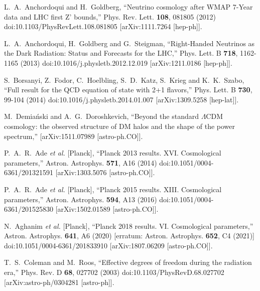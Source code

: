 \documentclass[universe,article,submit,moreauthors,pdftex,a4paper]{Definitions/mdpi}
\begin{document}
\begin{thebibliography}{99}
L.~A.~Anchordoqui and H.~Goldberg,
``Neutrino cosmology after WMAP 7-Year data and LHC first Z' bounds,''
Phys. Rev. Lett. \textbf{108}, 081805 (2012)
doi:10.1103/PhysRevLett.108.081805
[arXiv:1111.7264 [hep-ph]].

L.~A.~Anchordoqui, H.~Goldberg and G.~Steigman,
``Right-Handed Neutrinos as the Dark Radiation: Status and Forecasts for the LHC,''
Phys. Lett. B \textbf{718}, 1162-1165 (2013)
doi:10.1016/j.physletb.2012.12.019
[arXiv:1211.0186 [hep-ph]].

S.~Borsanyi, Z.~Fodor, C.~Hoelbling, S.~D.~Katz, S.~Krieg and K.~K.~Szabo,
``Full result for the QCD equation of state with 2+1 flavors,''
Phys. Lett. B \textbf{730}, 99-104 (2014)
doi:10.1016/j.physletb.2014.01.007
[arXiv:1309.5258 [hep-lat]].

M.~Demia\'nski and A.~G.~Doroshkevich,
``Beyond the standard $\Lambda$CDM cosmology: the observed structure of DM halos and the shape of the power spectrum,''
[arXiv:1511.07989 [astro-ph.CO]].

P.~A.~R.~Ade \textit{et al.} [Planck],
``Planck 2013 results. XVI. Cosmological parameters,''
Astron. Astrophys. \textbf{571}, A16 (2014)
doi:10.1051/0004-6361/201321591
[arXiv:1303.5076 [astro-ph.CO]].

P.~A.~R.~Ade \textit{et al.} [Planck],
``Planck 2015 results. XIII. Cosmological parameters,''
Astron. Astrophys. \textbf{594}, A13 (2016)
doi:10.1051/0004-6361/201525830
[arXiv:1502.01589 [astro-ph.CO]].

N.~Aghanim \textit{et al.} [Planck],
``Planck 2018 results. VI. Cosmological parameters,''
Astron. Astrophys. \textbf{641}, A6 (2020)
[erratum: Astron. Astrophys. \textbf{652}, C4 (2021)]
doi:10.1051/0004-6361/201833910
[arXiv:1807.06209 [astro-ph.CO]].

T.~S.~Coleman and M.~Roos,
``Effective degrees of freedom during the radiation era,''
Phys. Rev. D \textbf{68}, 027702 (2003)
doi:10.1103/PhysRevD.68.027702
[arXiv:astro-ph/0304281 [astro-ph]].


\end{thebibliography}
\end{document}
